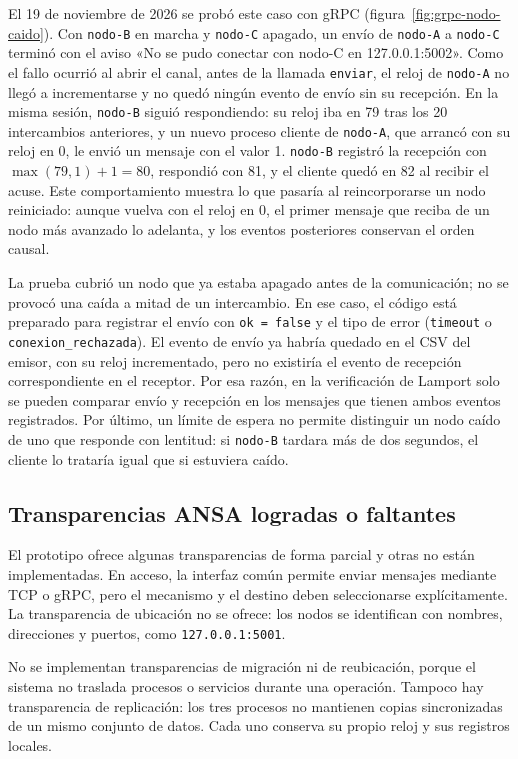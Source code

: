 El 19 de noviembre de 2026 se probó este caso con gRPC (figura~\ref{fig:grpc-nodo-caido}). Con \texttt{nodo-B} en marcha y \texttt{nodo-C} apagado, un envío de \texttt{nodo-A} a \texttt{nodo-C} terminó con el aviso «No se pudo conectar con nodo-C en 127.0.0.1:5002». Como el fallo ocurrió al abrir el canal, antes de la llamada \texttt{enviar}, el reloj de \texttt{nodo-A} no llegó a incrementarse y no quedó ningún evento de envío sin su recepción. En la misma sesión, \texttt{nodo-B} siguió respondiendo: su reloj iba en 79 tras los 20 intercambios anteriores, y un nuevo proceso cliente de \texttt{nodo-A}, que arrancó con su reloj en 0, le envió un mensaje con el valor 1. \texttt{nodo-B} registró la recepción con $\max(79, 1) + 1 = 80$, respondió con 81, y el cliente quedó en 82 al recibir el acuse. Este comportamiento muestra lo que pasaría al reincorporarse un nodo reiniciado: aunque vuelva con el reloj en 0, el primer mensaje que reciba de un nodo más avanzado lo adelanta, y los eventos posteriores conservan el orden causal.

La prueba cubrió un nodo que ya estaba apagado antes de la comunicación; no se provocó una caída a mitad de un intercambio. En ese caso, el código está preparado para registrar el envío con \texttt{ok = false} y el tipo de error (\texttt{timeout} o \texttt{conexion\_rechazada}). El evento de envío ya habría quedado en el CSV del emisor, con su reloj incrementado, pero no existiría el evento de recepción correspondiente en el receptor. Por esa razón, en la verificación de Lamport solo se pueden comparar envío y recepción en los mensajes que tienen ambos eventos registrados. Por último, un límite de espera no permite distinguir un nodo caído de uno que responde con lentitud: si \texttt{nodo-B} tardara más de dos segundos, el cliente lo trataría igual que si estuviera caído.

\subsection{Transparencias ANSA logradas o faltantes}

El prototipo ofrece algunas transparencias de forma parcial y otras no están implementadas. En acceso, la interfaz común permite enviar mensajes mediante TCP o gRPC, pero el mecanismo y el destino deben seleccionarse explícitamente. La transparencia de ubicación no se ofrece: los nodos se identifican con nombres, direcciones y puertos, como \texttt{127.0.0.1:5001}.

No se implementan transparencias de migración ni de reubicación, porque el sistema no traslada procesos o servicios durante una operación. Tampoco hay transparencia de replicación: los tres procesos no mantienen copias sincronizadas de un mismo conjunto de datos. Cada uno conserva su propio reloj y sus registros locales.


